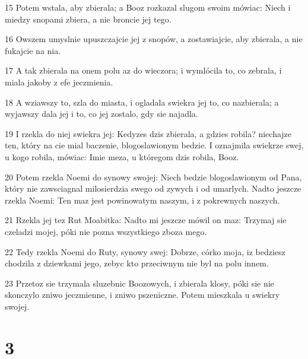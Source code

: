 \par 15 Potem wstala, aby zbierala; a Booz rozkazal slugom swoim mówiac: Niech i miedzy snopami zbiera, a nie broncie jej tego.
\par 16 Owszem umyslnie upuszczajcie jej z snopów, a zostawiajcie, aby zbierala, a nie fukajcie na nia.
\par 17 A tak zbierala na onem polu az do wieczora; i wymlócila to, co zebrala, i miala jakoby z efe jeczmienia.
\par 18 A wziawszy to, szla do miasta, i ogladala swiekra jej to, co nazbierala; a wyjawszy dala jej i to, co jej zostalo, gdy sie najadla.
\par 19 I rzekla do niej swiekra jej: Kedyzes dzis zbierala, a gdzies robila? niechajze ten, który na cie mial baczenie, blogoslawionym bedzie. I oznajmila swiekrze swej, u kogo robila, mówiac: Imie meza, u któregom dzis robila, Booz.
\par 20 Potem rzekla Noemi do synowy swojej: Niech bedzie blogoslawionym od Pana, który nie zawsciagnal milosierdzia swego od zywych i od umarlych. Nadto jeszcze rzekla Noemi: Ten maz jest powinowatym naszym, i z pokrewnych naszych.
\par 21 Rzekla jej tez Rut Moabitka: Nadto mi jeszcze mówil on maz: Trzymaj sie czeladzi mojej, póki nie pozna wszystkiego zboza mego.
\par 22 Tedy rzekla Noemi do Ruty, synowy swej: Dobrze, córko moja, iz bedziesz chodzila z dziewkami jego, zebyc kto przeciwnym nie byl na polu innem.
\par 23 Przetoz sie trzymala sluzebnic Boozowych, i zbierala klosy, póki sie nie skonczylo zniwo jeczmienne, i zniwo pszeniczne. Potem mieszkala u swiekry swojej.

\chapter{3}

